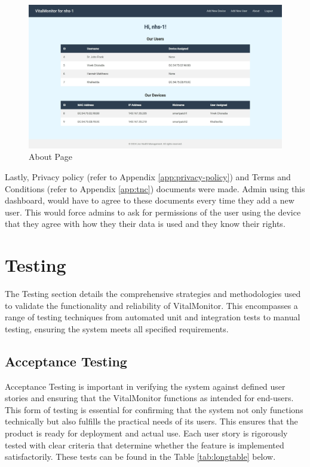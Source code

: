\begin{figure}[h!]
    \centering
    \includegraphics[width=1\linewidth]{images/dashboard-2.jpeg}
    \caption{About Page}
    \label{fig:about-page}
\end{figure}

\clearpage
\noindent Lastly, Privacy policy (refer to Appendix \ref{app:privacy-policy}) and Terms and Conditions (refer to Appendix \ref{app:tnc}) documents were made. Admin using this dashboard, would have to agree to these documents every time they add a new user. This would force admins to ask for permissions of the user using the device that they agree with how they their data is used and they know their rights. 


\section{Testing}
The Testing section details the comprehensive strategies and methodologies used to validate the functionality and reliability of VitalMonitor. This encompasses a range of testing techniques from automated unit and integration tests to manual testing, ensuring the system meets all specified requirements.

\subsection {Acceptance Testing}
Acceptance Testing is important in verifying the system against defined user stories and ensuring that the VitalMonitor functions as intended for end-users. This form of testing is essential for confirming that the system not only functions technically but also fulfills the practical needs of its users. This ensures that the product is ready for deployment and actual use. Each user story is rigorously tested with clear criteria that determine whether the feature is implemented satisfactorily. These tests can be found in the Table \ref{tab:longtable} below.


